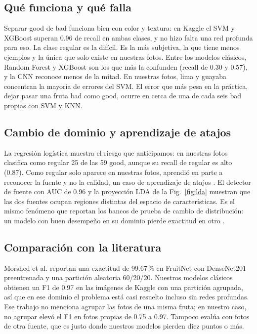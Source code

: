 \documentclass[conference]{IEEEtran}
\begin{document}
\subsection{Qué funciona y qué falla}
Separar good de bad funciona bien con color y textura: en Kaggle el SVM y XGBoost superan 0.96 de recall en ambas clases, y no hizo falta una red profunda para eso. La clase regular es la difícil. Es la más subjetiva, la que tiene menos ejemplos y la única que solo existe en nuestras fotos. Entre los modelos clásicos, Random Forest y XGBoost son los que más la confunden (recall de 0.30 y 0.57), y la CNN reconoce menos de la mitad. En nuestras fotos, lima y guayaba concentran la mayoría de errores del SVM. El error que más pesa en la práctica, dejar pasar una fruta bad como good, ocurre en cerca de una de cada seis bad propias con SVM y KNN.

\subsection{Cambio de dominio y aprendizaje de atajos}
La regresión logística muestra el riesgo que anticipamos: en nuestras fotos clasifica como regular 25 de las 59 good, aunque su recall de regular es alto (0.87). Como regular solo aparece en nuestras fotos, aprendió en parte a reconocer la fuente y no la calidad, un caso de aprendizaje de atajos \cite{geirhos2020}. El detector de fuente con AUC de 0.96 y la proyección LDA de la Fig.~\ref{fig:lda} muestran que las dos fuentes ocupan regiones distintas del espacio de características. Es el mismo fenómeno que reportan los bancos de prueba de cambio de distribución: un modelo con buen desempeño en su dominio pierde exactitud en otro \cite{koh2021}.

\subsection{Comparación con la literatura}
Morshed et al. \cite{morshed2022} reportan una exactitud de 99.67\,\% en FruitNet con DenseNet201 preentrenada y una partición aleatoria 60/20/20. Nuestros modelos clásicos obtienen un F1 de 0.97 en las imágenes de Kaggle con una partición agrupada, así que en ese dominio el problema está casi resuelto incluso sin redes profundas. Ese trabajo no menciona agrupar las fotos de una misma fruta; en nuestro caso, no agrupar elevó el F1 en fotos propias de 0.75 a 0.97. Tampoco evalúa con fotos de otra fuente, que es justo donde nuestros modelos pierden diez puntos o más.
\end{document}
